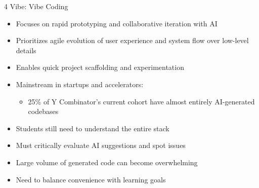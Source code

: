 \documentclass[xcolor={dvipsnames,table}, aspectratio=169]{beamer}
\begin{document}
\begin{frame}{4 Vibe: Vibe Coding}
  \begin{tcolorbox}[colback=green!10!white, colframe=green!60!black, title=Vibe Coding]
    \begin{itemize}
      \item Focuses on rapid prototyping and collaborative iteration with AI
      \item Prioritizes agile evolution of user experience and system flow over low-level details
      \item Enables quick project scaffolding and experimentation
      \item Mainstream in startups and accelerators:
        \begin{itemize}\footnotesize
          \item 25\% of Y Combinator's current cohort have almost entirely AI-generated codebases
        \end{itemize}
    \end{itemize}
  \end{tcolorbox}
  \begin{tcolorbox}[colback=red!10!white, colframe=red!60!black, title=Challenges]
    \begin{itemize}
      \item Students still need to understand the entire stack
      \item Must critically evaluate AI suggestions and spot issues
      \item Large volume of generated code can become overwhelming
      \item Need to balance convenience with learning goals
    \end{itemize}
  \end{tcolorbox}
\end{frame}
\end{document}
